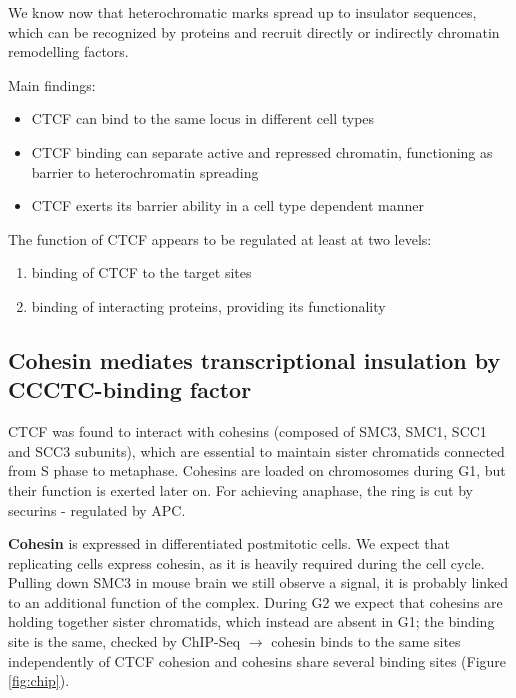 We know now that heterochromatic marks spread up to insulator sequences, which can be recognized by proteins and recruit directly or indirectly chromatin remodelling factors.

Main findings:

\begin{itemize}
\tightlist
\item
  CTCF can bind to the same locus in different cell types
\item
  CTCF binding can separate active and repressed chromatin, functioning as barrier to heterochromatin spreading
\item
  CTCF exerts its barrier ability in a cell type dependent manner
\end{itemize}

The function of CTCF appears to be regulated at least at two levels:

\begin{enumerate}
\def\labelenumi{\arabic{enumi}.}
\tightlist
\item
  binding of CTCF to the target sites
\item
  binding of interacting proteins, providing its functionality
\end{enumerate}

\hypertarget{cohesin-mediates-transcriptional-insulation-by-ccctc-binding-factor}{%
\subsection{Cohesin mediates transcriptional insulation by CCCTC-binding factor}\label{cohesin-mediates-transcriptional-insulation-by-ccctc-binding-factor}}

CTCF was found to interact with cohesins (composed of SMC3, SMC1, SCC1 and SCC3 subunits), which are essential to maintain sister chromatids connected from S phase to metaphase. Cohesins are loaded on chromosomes during G1, but their function is exerted later on. For achieving anaphase, the ring is cut by securins - regulated by APC.

\textbf{Cohesin} is expressed in differentiated postmitotic cells. We expect that replicating cells express cohesin, as it is heavily required during the cell cycle. Pulling down SMC3 in mouse brain we still observe a signal, it is probably linked to an additional function of the complex. During G2 we expect that cohesins are holding together sister chromatids, which instead are absent in G1; the binding site is the same, checked by ChIP-Seq $\rightarrow$ cohesin binds to the same sites independently of CTCF cohesion and cohesins share several binding sites (Figure \ref{fig:chip}).

